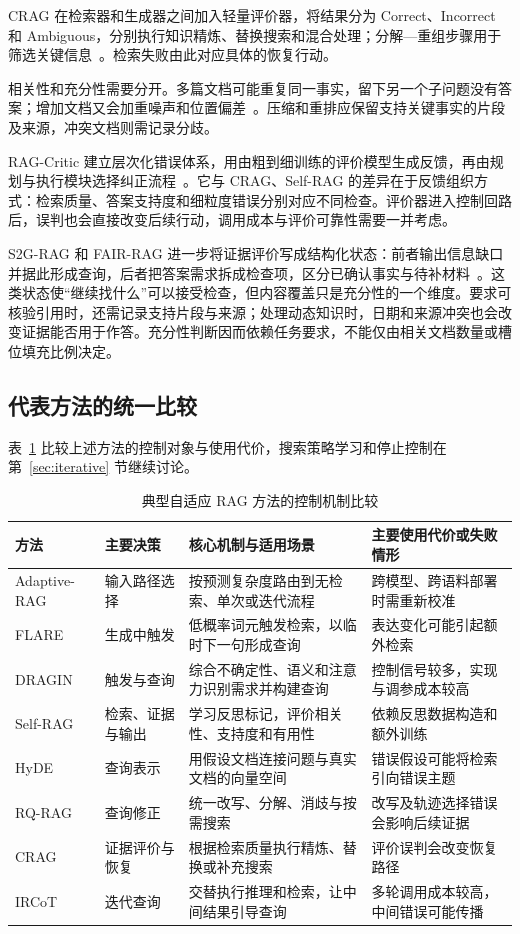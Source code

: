 CRAG 在检索器和生成器之间加入轻量评价器，将结果分为 Correct、Incorrect 和 Ambiguous，分别执行知识精炼、替换搜索和混合处理；分解—重组步骤用于筛选关键信息~\citep{yan2024crag}。检索失败由此对应具体的恢复行动。

相关性和充分性需要分开。多篇文档可能重复同一事实，留下另一个子问题没有答案；增加文档又会加重噪声和位置偏差~\citep{liu2024lost,cuconasu2024noise}。压缩和重排应保留支持关键事实的片段及来源，冲突文档则需记录分歧。

RAG-Critic 建立层次化错误体系，用由粗到细训练的评价模型生成反馈，再由规划与执行模块选择纠正流程~\citep{dong2025ragcritic}。它与 CRAG、Self-RAG 的差异在于反馈组织方式：检索质量、答案支持度和细粒度错误分别对应不同检查。评价器进入控制回路后，误判也会直接改变后续行动，调用成本与评价可靠性需要一并考虑。

S2G-RAG 和 FAIR-RAG 进一步将证据评价写成结构化状态：前者输出信息缺口并据此形成查询，后者把答案需求拆成检查项，区分已确认事实与待补材料~\citep{li2026s2g,aghajani2025fairrag}。这类状态使“继续找什么”可以接受检查，但内容覆盖只是充分性的一个维度。要求可核验引用时，还需记录支持片段与来源；处理动态知识时，日期和来源冲突也会改变证据能否用于作答。充分性判断因而依赖任务要求，不能仅由相关文档数量或槽位填充比例决定。

\subsection{代表方法的统一比较}

表~\ref{tab:methods} 比较上述方法的控制对象与使用代价，搜索策略学习和停止控制在第~\ref{sec:iterative} 节继续讨论。

\begin{table}[t]
\centering
\small
\caption{典型自适应 RAG 方法的控制机制比较}
\label{tab:methods}
\begin{tabularx}{\textwidth}{p{2.4cm}p{2.15cm}XX}
\toprule
方法 & 主要决策 & 核心机制与适用场景 & 主要使用代价或失败情形 \\
\midrule
Adaptive-RAG & 输入路径选择 & 按预测复杂度路由到无检索、单次或迭代流程 & 跨模型、跨语料部署时需重新校准 \\
FLARE & 生成中触发 & 低概率词元触发检索，以临时下一句形成查询 & 表达变化可能引起额外检索 \\
DRAGIN & 触发与查询 & 综合不确定性、语义和注意力识别需求并构建查询 & 控制信号较多，实现与调参成本较高 \\
Self-RAG & 检索、证据与输出 & 学习反思标记，评价相关性、支持度和有用性 & 依赖反思数据构造和额外训练 \\
HyDE & 查询表示 & 用假设文档连接问题与真实文档的向量空间 & 错误假设可能将检索引向错误主题 \\
RQ-RAG & 查询修正 & 统一改写、分解、消歧与按需搜索 & 改写及轨迹选择错误会影响后续证据 \\
CRAG & 证据评价与恢复 & 根据检索质量执行精炼、替换或补充搜索 & 评价误判会改变恢复路径 \\
IRCoT & 迭代查询 & 交替执行推理和检索，让中间结果引导查询 & 多轮调用成本较高，中间错误可能传播 \\
\bottomrule
\end{tabularx}
\end{table}
